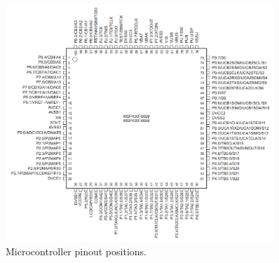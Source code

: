 \begin{figure}[!ht]
    \begin{center}
        \includegraphics[width=0.9\textwidth]{figures/msp430-pinout.png}
        \caption{Microcontroller pinout positions.}
        \label{fig:msp430-pinout-positions}
    \end{center}
\end{figure}

